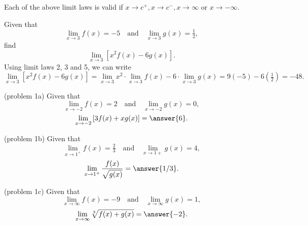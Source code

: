 \documentclass{ximera}
\begin{document}
Each of the above limit laws is valid if $x \to c^+, x\to c^-, x \to \infty$ or $x \to -\infty$.



\begin{example}[example 1] Given that 
\[
\lim_{x \to 3} f(x) = -5 \quad \text{and} \quad \lim_{x \to 3} g(x) = \tfrac12,
\]
find 
\[
\lim_{x \to 3} \left[x^2f(x) - 6g(x)\right].
\]
Using limit laws 2, 3 and 5, we can write
\[
\lim_{x \to 3} \left[x^2f(x) - 6g(x)\right] = \lim_{x \to 3} x^2 \cdot \lim_{x \to 3}f(x) - 6\cdot\lim_{x \to 3} g(x) = 9(-5) - 6(\tfrac12) = -48.
\]
\end{example}


\begin{problem}(problem 1a)
Given that 
\[
\lim_{x \to -2} f(x) = 2 \quad \text{and} \quad \lim_{x \to -2} g(x) = 0,
\]
\[
\lim_{x \to -2} \left[3f(x) + xg(x)\right] = \answer{6}.
\]
\end{problem}


\begin{problem}(problem 1b)
Given that 
\[
\lim_{x \to 1^+} f(x) = \tfrac23 \quad \text{and} \quad \lim_{x \to 1+} g(x) = 4,
\]
\[
\lim_{x \to 1^+} \frac{f(x)}{\sqrt{g(x)}} = \answer{1/3}.
\]
\end{problem}


\begin{problem}(problem 1c)
Given that 
\[
\lim_{x \to \infty} f(x) = -9 \quad \text{and} \quad \lim_{x \to \infty} g(x) = 1,
\]
\[
\lim_{x \to \infty} \sqrt[3]{f(x) + g(x)} = \answer{-2}.
\]
\end{problem}






\end{document}
